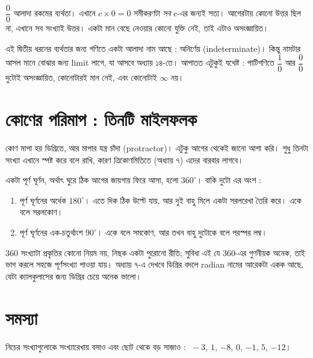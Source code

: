 \documentclass[11pt]{article}
\begin{document}
\begin{remark}
$\dfrac{0}{0}$ আলাদা রকমের ব্যর্থতা। এখানে $c \times 0 = 0$ সমীকরণটা
\emph{সব} $c$-এর জন্যই সত্য। আগেরটায় কোনো উত্তর ছিল না, এখানে সব সংখ্যাই
উত্তর। একটা মান বেছে নেওয়ার কোনো যুক্তি নেই, তাই এটাও অসংজ্ঞায়িত।

এই দ্বিতীয় ধরনের ব্যর্থতার জন্য গণিতে একটা আলাদা নাম আছে : অনির্ণেয়
(indeterminate)। কিন্তু নামটার আসল মানে বোঝার জন্য limit লাগে, যা আসবে
অধ্যায় ১৪-তে। আপাতত এটুকুই যথেষ্ট : পাটিগণিতে $\dfrac{1}{0}$ আর
$\dfrac{0}{0}$ দুটোই অসংজ্ঞায়িত, কোনোটারই মান নেই, এবং কোনোটাই $\infty$ নয়।
\end{remark}

\section{কোণের পরিমাপ : তিনটি মাইলফলক}

\noindent
কোণ মাপা হয় ডিগ্রিতে, আর মাপার যন্ত্র চাঁদা (protractor)। এটুকু আগের থেকেই জানো আশা করি। শুধু তিনটা সংখ্যা এখানে স্পষ্ট করে বলে রাখি, কারণ ত্রিকোণমিতিতে
(অধ্যায় ৭) এদের বারবার লাগবে।

\begin{idea}
একটা পূর্ণ ঘূর্ণন, অর্থাৎ ঘুরে ঠিক আগের জায়গায় ফিরে আসা, হলো $360^\circ$।
বাকি দুটো এর অংশ :

\begin{enumerate}
  \item পূর্ণ ঘূর্ণনের অর্ধেক $180^\circ$। এতে দিক ঠিক উল্টে যায়, আর দুই বাহু
        মিলে একটা সরলরেখা তৈরি করে। একে বলে সরলকোণ।
  \item পূর্ণ ঘূর্ণনের এক-চতুর্থাংশ $90^\circ$। একে বলে সমকোণ, আর তখন বাহু
        দুটোকে বলে পরস্পর লম্ব।
\end{enumerate}

\noindent
$360$ সংখ্যাটা প্রকৃতির কোনো নিয়ম নয়, নিছক একটা পুরোনো রীতি; সুবিধা এই যে
$360$-এর গুণনীয়ক অনেক, তাই ভাগ করলে সহজে পূর্ণসংখ্যা পাওয়া যায়। অধ্যায়
৭-এ দেখবে ডিগ্রির বদলে radian নামের আরেকটা একক আছে, যেটা ক্যালকুলাসের জন্য
ডিগ্রির চেয়ে অনেক ভালো।
\end{idea}

\section{সমস্যা}

 নিচের সংখ্যাগুলোকে সংখ্যারেখায় বসাও এবং ছোট থেকে বড় সাজাও :
$\;-3$, \; $1$, \; $-8$, \; $0$, \; $-1$, \; $5$, \; $-12$।
\end{document}
